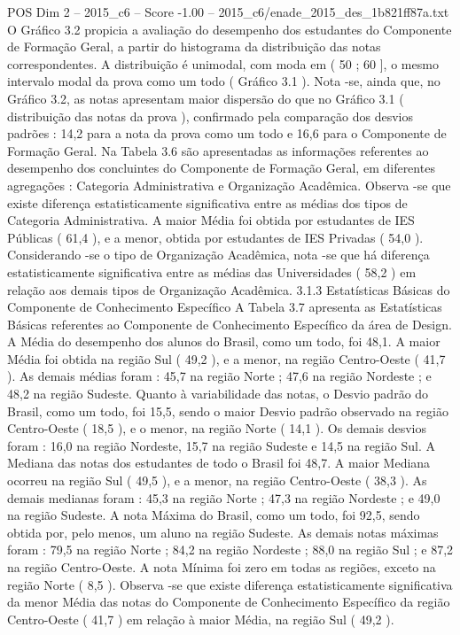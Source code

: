 \begin{textsample}{POS Dim 2 – 2015\_c6 – Score -1.00 – 2015\_c6/enade\_2015\_des\_1b821ff87a.txt}
O Gráfico 3.2 propicia a avaliação do desempenho dos estudantes do Componente de Formação Geral, a partir do histograma da distribuição das notas correspondentes.
A distribuição é unimodal, com moda em ( 50 ; 60 ], o mesmo intervalo modal da prova como um todo ( Gráfico 3.1 ).
Nota -se, ainda que, no Gráfico 3.2, as notas apresentam maior dispersão do que no Gráfico 3.1 ( distribuição das notas da prova ), confirmado pela comparação dos desvios padrões : 14,2 para a nota da prova como um todo e 16,6 para o Componente de Formação Geral.
Na Tabela 3.6 são apresentadas as informações referentes ao desempenho dos concluintes do Componente de Formação Geral, em diferentes agregações : Categoria Administrativa e Organização Acadêmica.
Observa -se que existe diferença estatisticamente significativa entre as médias dos tipos de Categoria Administrativa.
A maior Média foi obtida por estudantes de IES Públicas ( 61,4 ), e a menor, obtida por estudantes de IES Privadas ( 54,0 ).
Considerando -se o tipo de Organização Acadêmica, nota -se que há diferença estatisticamente significativa entre as médias das Universidades ( 58,2 ) em relação aos demais tipos de Organização Acadêmica. 3.1.3 Estatísticas Básicas do Componente de Conhecimento Específico A Tabela 3.7 apresenta as Estatísticas Básicas referentes ao Componente de Conhecimento Específico da área de Design.
A Média do desempenho dos alunos do Brasil, como um todo, foi 48,1.
A maior Média foi obtida na região Sul ( 49,2 ), e a menor, na região Centro-Oeste ( 41,7 ).
As demais médias foram : 45,7 na região Norte ; 47,6 na região Nordeste ; e 48,2 na região Sudeste.
Quanto à variabilidade das notas, o Desvio padrão do Brasil, como um todo, foi 15,5, sendo o maior Desvio padrão observado na região Centro-Oeste ( 18,5 ), e o menor, na região Norte ( 14,1 ).
Os demais desvios foram : 16,0 na região Nordeste, 15,7 na região Sudeste e 14,5 na região Sul.
A Mediana das notas dos estudantes de todo o Brasil foi 48,7.
A maior Mediana ocorreu na região Sul ( 49,5 ), e a menor, na região Centro-Oeste ( 38,3 ).
As demais medianas foram : 45,3 na região Norte ; 47,3 na região Nordeste ; e 49,0 na região Sudeste.
A nota Máxima do Brasil, como um todo, foi 92,5, sendo obtida por, pelo menos, um aluno na região Sudeste.
As demais notas máximas foram : 79,5 na região Norte ; 84,2 na região Nordeste ; 88,0 na região Sul ; e 87,2 na região Centro-Oeste.
A nota Mínima foi zero em todas as regiões, exceto na região Norte ( 8,5 ).
Observa -se que existe diferença estatisticamente significativa da menor Média das notas do Componente de Conhecimento Específico da região Centro-Oeste ( 41,7 ) em relação à maior Média, na região Sul ( 49,2 ).

\end{textsample}
